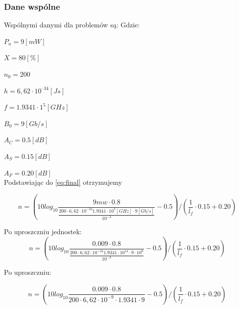 \documentclass[paper=a4, fontsize=11pt]{scrartcl} %
\numberwithin{equation}{section} %
\numberwithin{figure}{section} %
\numberwithin{table}{section} %
\begin{document}
\subsubsection { Dane wspólne }

Wspólnymi danymi dla problemów  są:
Gdzie:\\
\par \setlength\parindent{24pt}
\(P_n = 9 [mW] \) \\
\par \setlength\parindent{24pt}
\(X = 80 [\%]\) \\
\par \setlength\parindent{24pt}
\(n_0 = 200\) \\
\par \setlength\parindent{24pt}
\(h = 6,62\cdot10^{–34}[Js]\)\\
\par \setlength\parindent{24pt}
\(f = 1.9341 \cdot 1^5 [GHz]\) \\
\par \setlength\parindent{24pt}
\(B_0 = 9[Gb/s]\) \\
\par \setlength\parindent{24pt}
\(A_C = 0.5 [dB]\) \\
\par \setlength\parindent{24pt}
\(A_S = 0.15 [dB]\) \\
\par \setlength\parindent{24pt}
\(A_F = 0.20 [dB] \) \\

Podstawiając do \eqref{eq:final} otrzymujemy

\begin{equation} 
  n = ( 10log_{10}\frac{9mw \cdot 0.8}{\frac{200 \cdot 6,62 \cdot 10^{-34}1.9341 \cdot 10^5[GHz] \cdot 9 [Gb/s]}{10^{-3}}} - 0.5 ) / (\frac{1}{l_f} \cdot 0.15 + 0.20)
\end{equation}

Po uproszczniu jednostek:
\begin{equation} 
  n = ( 10log_{10}\frac{0.009 \cdot 0.8}{\frac{200 \cdot 6,62 \cdot 10^{-34}1.9341 \cdot 10^{14} \cdot 9\cdot10^9 }{10^{-3}}} - 0.5 ) / (\frac{1}{l_f} \cdot 0.15 + 0.20)
\end{equation}

Po uproszczniu:

\begin{equation} 
  n = ( 10log_{10}\frac{0.009 \cdot 0.8}{200 \cdot 6,62 \cdot 10^{-9} \cdot 1.9341 \cdot 9} - 0.5 ) / (\frac{1}{l_f} \cdot 0.15 + 0.20)
\end{equation}
\end{document}
